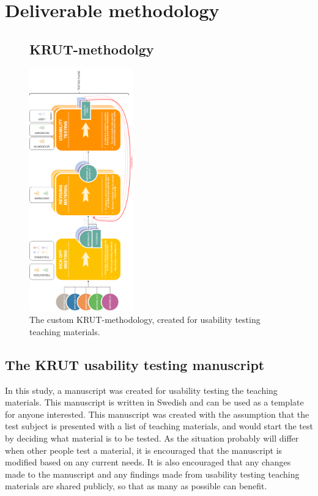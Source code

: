 \chapter{Deliverable methodology}


\mbox{}
\begin{figure}
\section{KRUT-methodolgy}
\includegraphics[trim={0 0cm 0 0},clip,width=0.4\textwidth,angle=-90]{figure/workflow.png}
\vspace*{2cm}
\caption{The custom KRUT-methodology, created for usability testing teaching materials.}
\label{app:krut}
\end{figure}

\newpage
\section{The KRUT usability testing manuscript} \label{krutscript}
In this study, a manuscript was created for usability testing the teaching materials. This manuscript is written in Swedish and can be used as a template for anyone interested. This manuscript was created with the assumption that the test subject is presented with a list of teaching materials, and would start the test by deciding what material is to be tested. As the situation probably will differ when other people test a material, it is encouraged that the manuscript is modified based on any current needs. It is also encouraged that any changes made to the manuscript and any findings made from usability testing teaching materials are shared publicly, so that as many as possible can benefit.

